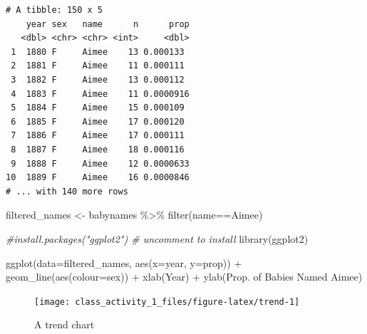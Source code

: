 \documentclass[
]{book}
\newenvironment{Shaded}{\begin{snugshade}}{\end{snugshade}}
\newcommand{\AttributeTok}[1]{\textcolor[rgb]{0.77,0.63,0.00}{#1}}
\newcommand{\CommentTok}[1]{\textcolor[rgb]{0.56,0.35,0.01}{\textit{#1}}}
\newcommand{\FunctionTok}[1]{\textcolor[rgb]{0.00,0.00,0.00}{#1}}
\newcommand{\NormalTok}[1]{#1}
\newcommand{\OtherTok}[1]{\textcolor[rgb]{0.56,0.35,0.01}{#1}}
\newcommand{\SpecialCharTok}[1]{\textcolor[rgb]{0.00,0.00,0.00}{#1}}
\newcommand{\StringTok}[1]{\textcolor[rgb]{0.31,0.60,0.02}{#1}}
\begin{document}
\begin{verbatim}
# A tibble: 150 x 5
    year sex   name      n      prop
   <dbl> <chr> <chr> <int>     <dbl>
 1  1880 F     Aimee    13 0.000133 
 2  1881 F     Aimee    11 0.000111 
 3  1882 F     Aimee    13 0.000112 
 4  1883 F     Aimee    11 0.0000916
 5  1884 F     Aimee    15 0.000109 
 6  1885 F     Aimee    17 0.000120 
 7  1886 F     Aimee    17 0.000111 
 8  1887 F     Aimee    18 0.000116 
 9  1888 F     Aimee    12 0.0000633
10  1889 F     Aimee    16 0.0000846
# ... with 140 more rows
\end{verbatim}

\begin{Shaded}
\begin{Highlighting}[]
\NormalTok{filtered\_names }\OtherTok{\textless{}{-}}\NormalTok{ babynames }\SpecialCharTok{\%\textgreater{}\%} \FunctionTok{filter}\NormalTok{(name}\SpecialCharTok{==}\StringTok{\textquotesingle{}Aimee\textquotesingle{}}\NormalTok{)}
\end{Highlighting}
\end{Shaded}

\begin{Shaded}
\begin{Highlighting}[]
\CommentTok{\#install.packages("ggplot2")   \# uncomment to install}
\FunctionTok{library}\NormalTok{(ggplot2)}
\end{Highlighting}
\end{Shaded}

\begin{Shaded}
\begin{Highlighting}[]
\FunctionTok{ggplot}\NormalTok{(}\AttributeTok{data=}\NormalTok{filtered\_names, }\FunctionTok{aes}\NormalTok{(}\AttributeTok{x=}\NormalTok{year, }\AttributeTok{y=}\NormalTok{prop)) }\SpecialCharTok{+} 
  \FunctionTok{geom\_line}\NormalTok{(}\FunctionTok{aes}\NormalTok{(}\AttributeTok{colour=}\NormalTok{sex)) }\SpecialCharTok{+} 
  \FunctionTok{xlab}\NormalTok{(}\StringTok{\textquotesingle{}Year\textquotesingle{}}\NormalTok{) }\SpecialCharTok{+} 
  \FunctionTok{ylab}\NormalTok{(}\StringTok{\textquotesingle{}Prop. of Babies Named Aimee\textquotesingle{}}\NormalTok{)}
\end{Highlighting}
\end{Shaded}

\begin{figure}
\texttt{[image: class\_activity\_1\_files/figure-latex/trend-1]} \caption{A trend chart}\label{fig:trend}
\end{figure}
\end{document}
